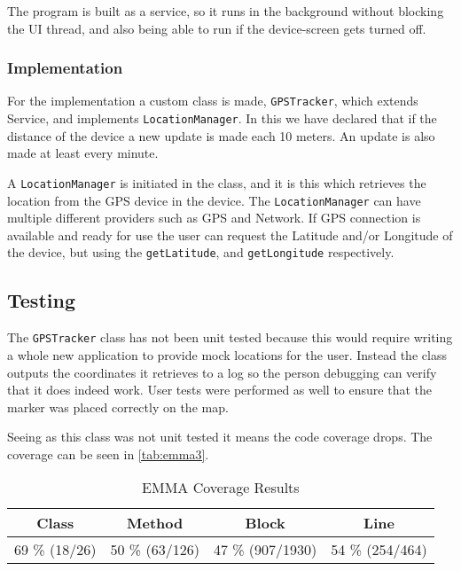 The program is built as a service, so it runs in the background without blocking the UI thread, and also being able to run if the device-screen gets turned off.

\subsubsection{Implementation}
For the implementation a custom class is made, \texttt{GPSTracker}, which extends Service, and implements \texttt{LocationManager}.
In this we have declared that if the distance of the device a new update is made each 10 meters. An update is also made at least every minute.

A \texttt{LocationManager} is initiated in the class, and it is this which retrieves the location from the \ac{GPS} device in the device. The \texttt{LocationManager} can have multiple different providers such as \ac{GPS} and Network.
If \ac{GPS} connection is available and ready for use the user can request the Latitude and/or Longitude of the device, but using the \texttt{getLatitude}, and \texttt{getLongitude} respectively.

\subsection{Testing}
The \texttt{GPSTracker} class has not been unit tested because this would require writing a whole new application to provide mock locations for the user. Instead the class outputs the coordinates it retrieves to a log so the person debugging can verify that it does indeed work. User tests were performed as well to ensure that the marker was placed correctly on the map.

Seeing as this class was not unit tested it means the code coverage drops. The coverage can be seen in \autoref{tab:emma3}.

\begin{table}[!ht]
	\centering
	\begin{tabular}{| c | c | c | c |}
		\hline
		\textbf{Class} & \textbf{Method} & \textbf{Block} & \textbf{Line} \\ \hline
		69 \% (18/26) & 50 \% (63/126) & 47 \% (907/1930) & 54 \% (254/464) \\
		\hline
	\end{tabular}
	\caption{EMMA Coverage Results}
	\label{tab:emma3}
\end{table}
